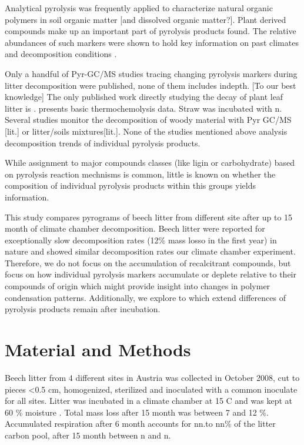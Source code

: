 \documentclass[preprint,review,12pt]{elsarticle}
\begin{document}
Analytical pyrolysis was frequently applied to characterize natural organic polymers in soil organic matter [and dissolved organic matter?]. Plant derived compounds make up an important part of pyrolysis products found. The relative abundances of such markers were shown to hold key information on past climates and decomposition conditions \cite{i.e. Kuder1998, Schellekens2009, Schellekens2011}. 

Only a handful of Pyr-GC/MS studies tracing changing pyrolysis markers during litter decomposition were published, none of them includes indepth. [To our best knowledge] The only published work directly studying the decay of plant leaf litter is \cite{Franchini2002}. \cite{Snajdr2010} presents basic thermochemolysis data.  Straw was incubated with n. Several studies monitor the decomposition of woody material with Pyr GC/MS [lit.] or litter/soils mixtures[lit.]. None of the studies mentioned above analysis decomposition trends of individual pyrolysis products.

While assignment to major compounds classes (like ligin or carbohydrate) based on pyrolysis reaction mechnisms is common, little is known on whether the composition of individual pyrolysis products within this groups yields information. 

This study compares pyrograms of beech litter from different site after up to 15 month of climate chamber decomposition. Beech litter were reported for exceptionally slow decomposition rates (12\% mass losso in the first year) in nature \citep{Klotzbucher2011} and showed similar decomposition rates our climate chamber experiment. Therefore, we do not focus on the accumulation of recalcitrant compounds, but focus on how individual pyrolysis markers accumulate or deplete relative to their compounds of origin which might provide insight into changes in polymer condensation patterns. Additionally, we explore to which extend differences of pyrolysis products remain after incubation.

\section{Material and Methods}

Beech litter from 4 different sites in Austria was collected in October 2008, cut to pieces \textless 0.5 cm, homogenized, sterilized and inoculated with a common inoculate for all sites. Litter was incubated in a climate chamber at 15 \textdegree C and was kept at 60 \% moisture \citep{Wanek2010}. Total mass loss after 15 month was between 7 and 12 \%. Accumulated respiration after 6 month accounts for nn.to nn\% of the litter carbon pool, after 15 month between n and n.
\end{document}
